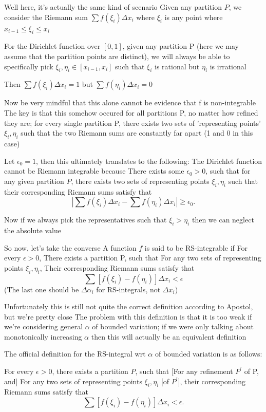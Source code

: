 Well here, it's actually the same kind of scenario
Given any partition $P$, we consider the Riemann sum $\sum f(\xi_i)\Delta x_i$ where $\xi_i$ is any point where $x_{i-1}\le\xi_i\le x_i$

For the Dirichlet function over $[0,1]$, given any partition P (here we may assume that the partition points are distinct), we will always be able to specifically pick $\xi_i,\eta_i\in[x_{i-1},x_i]$ such that $\xi_i$ is rational but $\eta_i$ is irrational

Then $\sum f(\xi_i)\Delta x_i=1$ but $\sum f(\eta_i)\Delta x_i=0$

Now be very mindful that this alone cannot be evidence that f is non-integrable
The key is that this somehow occured for all partitions P, no matter how refined they are; for every single partition P, there exists two sets of 'representing points' $\xi_i,\eta_i$ such that the two Riemann sums are constantly far apart (1 and 0 in this case)

Let $\epsilon_0=1$, then this ultimately translates to the following:
The Dirichlet function cannot be Riemann integrable because
There exists some $\epsilon_0>0$, such that for any given partition $P$, there exists two sets of representing points $\xi_i,\eta_i$ such that their corresponding Riemann sums satisfy that
\[ |\sum f(\xi_i)\Delta x_i - \sum f(\eta_i)\Delta x_i|\ge\epsilon_0. \]

Now if we always pick the representatives such that $\xi_i>\eta_i$ then we can neglect the absolute value

So now, let's take the converse
A function $f$ is said to be RS-integrable if
For every $\epsilon>0$,
There exists a partition P, such that
For any two sets of representing points $\xi_i,\eta_i$,
Their corresponding Riemann sums satisfy that
\[ \sum[f(\xi_i)-f(\eta_i)]\Delta x_i<\epsilon \]
(The last one should be $\Delta \alpha_i$ for RS-integrals, not $\Delta x_i$)

Unfortunately this is still not quite the correct definition according to Apostol, but we're pretty close
The problem with this definition is that it is too weak if we're considering general $\alpha$ of bounded variation; if we were only talking about monotonically increasing $\alpha$ then this will actually be an equivalent definition

The official definition for the RS-integral wrt $\alpha$ of bounded variation is as follows:
\begin{definition}
For every $\epsilon>0$, there exists a partition $P$, such that
[For any refinement $P^\prime$ of P, and]
For any two sets of representing points $\xi_i,\eta_i$ [of $P^\prime$], their corresponding Riemann sums satisfy that
\[ \sum[f(\xi_i)-f(\eta_i)]\Delta x_i<\epsilon. \]
\end{definition}

